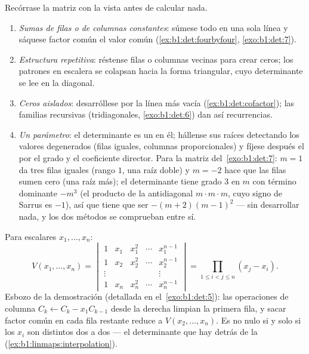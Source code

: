 \begin{method}
\label{met:b1:det:strategy}
Recórrase la matriz con la vista antes de calcular nada.
\begin{enumerate}
  \item \emph{Sumas de filas o de columnas constantes}: súmese todo
        en una sola línea y sáquese factor común el valor común
        (\cref{ex:b1:det:fourbyfour}, \cref{exo:b1:det:7}).
  \item \emph{Estructura repetitiva}: réstense filas o columnas
        vecinas para crear ceros; los patrones en escalera se
        colapsan hacia la forma triangular, cuyo determinante se lee
        en la diagonal.
  \item \emph{Ceros aislados}: desarróllese por la línea más vacía
        (\cref{ex:b1:det:cofactor}); las familias recursivas
        (tridiagonales, \cref{exo:b1:det:6}) dan así recurrencias.
  \item \emph{Un parámetro}: el determinante es un  en él;
        hállense sus raíces detectando los valores degenerados
        (filas iguales, columnas proporcionales) y fíjese después el
         por el grado y el coeficiente director. Para la
        matriz del~\cref{exo:b1:det:7}: $m = 1$ da tres filas iguales
        (rango $1$, una raíz doble) y $m = -2$ hace que las filas
        sumen cero (una raíz más); el determinante tiene grado $3$ en
        $m$ con término dominante $-m^3$ (el producto de la
        antidiagonal $m\cdot m\cdot m$, cuyo signo de Sarrus es
        $-1$), así que tiene que ser $-(m+2)(m-1)^2$ --- sin
        desarrollar nada, y los dos métodos se comprueban entre sí.
\end{enumerate}
\end{method}

\begin{example}\label{ex:b1:det:vandermonde}
Para escalares $x_1, \dots, x_n$:
\[
V(x_1, \dots, x_n) =
\begin{vmatrix}
1 & x_1 & x_1^2 & \cdots & x_1^{n-1}\\
1 & x_2 & x_2^2 & \cdots & x_2^{n-1}\\
\vdots & & & & \vdots\\
1 & x_n & x_n^2 & \cdots & x_n^{n-1}
\end{vmatrix}
= \prod_{1 \leq i < j \leq n} (x_j - x_i) .
\]
Esbozo de la demostración (detallada en el~\cref{exo:b1:det:5}): las
operaciones de columna $C_k \leftarrow C_k - x_1 C_{k-1}$ desde la
derecha limpian la primera fila, y sacar factor común en cada fila
restante reduce a $V(x_2, \dots, x_n)$. Es no nulo si y solo si los
$x_i$ son distintos dos a dos --- el determinante que hay detrás de
la  (\cref{ex:b1:linmaps:interpolation}).
\end{example}

